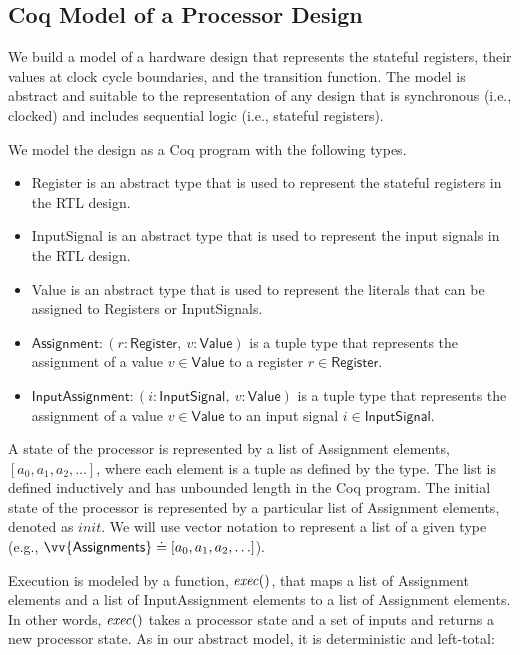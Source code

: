 \subsection{Coq Model of a Processor Design}
We build a model of a hardware design that represents the stateful
registers, their values at clock cycle boundaries, and the transition
function. The model is abstract and suitable to the representation of any design
that is synchronous (i.e., clocked) and includes sequential logic (i.e.,
stateful registers).

We model the design as a Coq program with the following types.
\begin{itemize}
\item \textsf{Register} is an abstract type that is used to represent the
  stateful registers in the RTL design.
\item \textsf{InputSignal} is an abstract type that is used to represent the
  input signals in the RTL design.
\item \textsf{Value} is an abstract type that is used to represent the
  literals that can be assigned to \textsf{Register}s or \textsf{InputSignal}s.
\item $\textsf{Assignment} : (r: \textsf{Register},~ v: \textsf{Value})$ is a
  tuple type that represents the assignment of a value $v \in \textsf{Value}$
  to a register $r \in \textsf{Register}$.
\item $\textsf{InputAssignment} : (i: \textsf{InputSignal},~ v:
  \textsf{Value})$ is a tuple type that represents the assignment of a
  value $v \in \textsf{Value}$ to an input signal $i \in \textsf{InputSignal}$.
\end{itemize}

A state of the processor is represented by a list of \textsf{Assignment} elements, $[a_0, a_1, a_2,
\ldots]$, where each element is a tuple as defined by the type. The list is
defined inductively and has unbounded length in the Coq
program. The initial state of the processor is represented by a particular list
of \textsf{Assignment} elements, denoted as $\mathit{init}$. We will use vector notation to
represent a list of a given type (e.g., $\vv{\textsf{Assignments}} \doteq [a_0,
a_1, a_2, \ldots]$).

Execution is modeled by a function, $\mathit{exec}()$, that maps a list of
\textsf{Assignment} elements and
a list of \textsf{InputAssignment} elements to a list of
\textsf{Assignment} elements. In other words, $\mathit{exec}()$ takes a
processor state and a set of inputs and returns a new processor state. As in our abstract model, it is deterministic and left-total:

